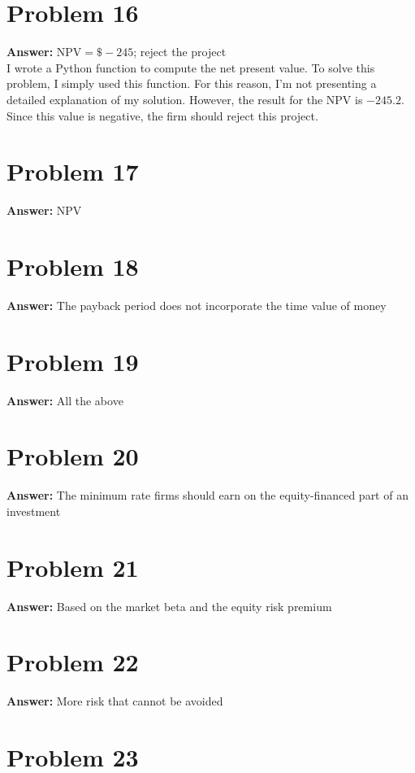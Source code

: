 \documentclass[11pt]{article}
\begin{document}
\section*{Problem 16}
\label{sec:orgc751923}

\textbf{Answer:} \(\mathrm{NPV}=\$-245\); reject the project\\

I wrote a Python function to compute the net present value. To solve this
problem, I simply used this function. For this reason, I'm not presenting a
detailed explanation of my solution. However, the result for the NPV is
\(-245.2\). Since this value is negative, the firm should reject this project.
\section*{Problem 17}
\label{sec:org92d226c}

\textbf{Answer:} NPV
\section*{Problem 18}
\label{sec:org84b75c6}

\textbf{Answer:} The payback period does not incorporate the time value of money
\section*{Problem 19}
\label{sec:org98e27c6}

\textbf{Answer:} All the above
\section*{Problem 20}
\label{sec:org9e4ee16}

\textbf{Answer:} The minimum rate firms should earn on the equity-financed part of an
investment
\section*{Problem 21}
\label{sec:org3abdac1}

\textbf{Answer:} Based on the market beta and the equity risk premium
\section*{Problem 22}
\label{sec:orge9890b0}

\textbf{Answer:} More risk that cannot be avoided
\section*{Problem 23}
\label{sec:orgba06229}
\end{document}
